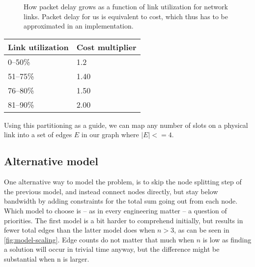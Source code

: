 \begin{figure}
    \centering
    \caption{How packet delay grows as a function of link utilization for network links. Packet delay for us is equivalent to cost, which thus has to be approximated in an implementation.}
    \label{fig:utility-latency}
\end{figure}


\begin{center}
    \label{tab:utilization-to-cost}
    \begin{tabular}{| l | l |}
    \hline
    \textbf{Link utilization} & \textbf{Cost multiplier} \\ \hline
    0--50\% & 1.2 \\ \hline
    51--75\% & 1.40 \\ \hline
    76--80\% & 1.50 \\ \hline
    81--90\% & 2.00 \\ \hline
    \end{tabular}
\end{center}

Using this partitioning as a guide, we can map any number of slots on a physical link into a set of edges $E$ in our graph where $|E| <= 4$.




\subsection{Alternative model}

One alternative way to model the problem, is to skip the node splitting step of the previous model, and instead connect nodes directly, but stay below bandwidth by adding constraints for the total sum going out from each node. Which model to choose is -- as in every engineering matter -- a question of priorities. The first model is a bit harder to comprehend initially, but results in fewer total edges than the latter model does when $n>3$, as can be seen in \autoref{fig:model-scaling}. Edge counts do not matter that much when $n$ is low as finding a solution will occur in trivial time anyway, but the difference might be substantial when n is larger. 

